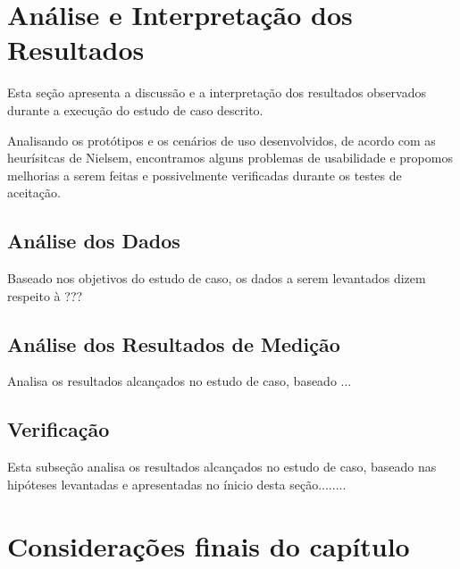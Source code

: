 \section{Análise e Interpretação dos Resultados}

Esta seção apresenta a discussão e a interpretação dos resultados observados durante a execução do estudo de caso descrito.

Analisando os protótipos e os cenários de uso desenvolvidos, de acordo com as heurísitcas de Nielsem, encontramos alguns problemas de usabilidade e propomos melhorias a serem feitas e possivelmente verificadas durante os testes de aceitação.

\subsection{Análise dos Dados}

Baseado nos objetivos do estudo de caso, os dados a serem levantados dizem respeito à ???

\subsection{Análise dos Resultados de Medição}

Analisa os resultados alcançados no estudo de caso, baseado ...

\subsection{Verificação}

Esta subseção analisa os resultados alcançados no estudo de caso, baseado nas hipóteses levantadas e apresentadas no ínicio desta seção........


\section{Considerações finais do capítulo}







